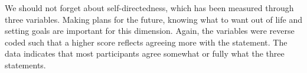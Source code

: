 \documentclass[11pt]{article}
\begin{document}
We should not forget about self-directedness, which has been measured through three variables.
Making plans for the future, knowing what to want out of life and setting goals are important for this dimension.
Again, the variables were reverse coded such that a higher score reflects agreeing more with the statement.
The data indicates that most participants agree somewhat or fully what the three statements.

\begin{table}[h!]
\end{table}

\begin{table}[h!]
\end{table}
\end{document}
